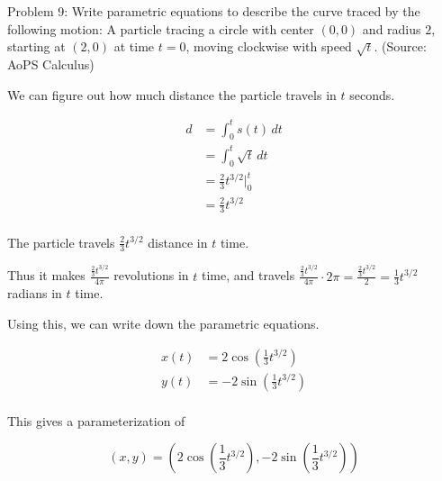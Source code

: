 Problem 9: Write parametric equations to describe the curve traced by the following motion: A particle tracing a circle with center $(0, 0)$ and radius $2$, starting at $(2, 0)$ at time $t = 0$, moving clockwise with speed $\sqrt t$. (Source: AoPS Calculus)

We can figure out how much distance the particle travels in $t$ seconds.

\begin{align*}
d &= \int_0^t s(t) \, dt \\
&= \int_0^t \sqrt t \, dt \\
&= \frac{2}{3} t^{3/2} \Bigg|_0^t \\
&= \frac{2}{3} t^{3/2} \\
\end{align*}

The particle travels $\frac{2}{3} t^{3/2}$ distance in $t$ time.

Thus it makes $\frac{\frac{2}{3} t^{3/2}}{4\pi}$ revolutions in $t$ time, and travels $\frac{\frac{2}{3} t^{3/2}}{4\pi} \cdot 2\pi = \frac{\frac{2}{3} t^{3/2}}{2} = \frac{1}{3} t^{3/2}$ radians in $t$ time.

Using this, we can write down the parametric equations.

\begin{align*}
x(t) &= 2 \cos \left( \frac{1}{3} t^{3/2} \right) \\
y(t) &= -2 \sin \left( \frac{1}{3} t^{3/2} \right) \\
\end{align*}

This gives a parameterization of

$$ \boxed{(x, y) = \left(2 \cos \left( \frac{1}{3} t^{3/2} \right), -2 \sin \left( \frac{1}{3} t^{3/2} \right)\right)} $$
